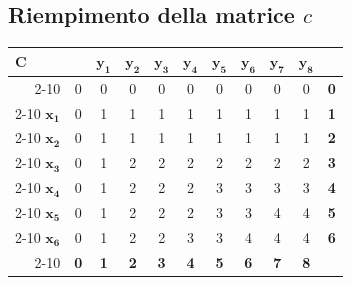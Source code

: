 \subsection{Riempimento della matrice $c$}
\begin{center}
\renewcommand{\arraystretch}{1.65}
\setlength{\tabcolsep}{11pt}
\begin{tabular}{r | c | c | c | c | c | c | c | c | c | l}
\multicolumn{1}{l}{\Large $\boldsymbol{C}$} & \multicolumn{1}{c}{} & \multicolumn{1}{c}{\textcolor{ycolor}{$\mathbf{y_1}$}} & \multicolumn{1}{c}{\textcolor{ycolor}{$\mathbf{y_2}$}} & \multicolumn{1}{c}{\textcolor{ycolor}{$\mathbf{y_3}$}} & \multicolumn{1}{c}{\textcolor{ycolor}{$\mathbf{y_4}$}} & \multicolumn{1}{c}{\textcolor{ycolor}{$\mathbf{y_5}$}} & \multicolumn{1}{c}{\textcolor{ycolor}{$\mathbf{y_6}$}} & \multicolumn{1}{c}{\textcolor{ycolor}{$\mathbf{y_7}$}} & \multicolumn{1}{c}{\textcolor{ycolor}{$\mathbf{y_8}$}} & \multicolumn{1}{l}{} \\
\cline{2-10}
 & 0 & 0 & 0 & 0 & 0 & 0 & 0 & 0 & 0 & \textcolor{xring}{\textbf{0}} \\
\cline{2-10}
\textcolor{xcolor}{$\mathbf{x_1}$} & 0 & 1 & 1 & 1 & 1 & 1 & 1 & 1 & 1 & \textcolor{xring}{\textbf{1}} \\
\cline{2-10}
\textcolor{xcolor}{$\mathbf{x_2}$} & 0 & 1 & 1 & 1 & 1 & 1 & 1 & 1 & 1 & \textcolor{xring}{\textbf{2}} \\
\cline{2-10}
\textcolor{xcolor}{$\mathbf{x_3}$} & 0 & 1 & 2 & 2 & 2 & 2 & 2 & 2 & 2 & \textcolor{xring}{\textbf{3}} \\
\cline{2-10}
\textcolor{xcolor}{$\mathbf{x_4}$} & 0 & 1 & 2 & 2 & 2 & 3 & 3 & 3 & 3 & \textcolor{xring}{\textbf{4}} \\
\cline{2-10}
\textcolor{xcolor}{$\mathbf{x_5}$} & 0 & 1 & 2 & 2 & 2 & 3 & 3 & 4 & 4 & \textcolor{xring}{\textbf{5}} \\
\cline{2-10}
\textcolor{xcolor}{$\mathbf{x_6}$} & 0 & 1 & 2 & 2 & 3 & 3 & 4 & 4 & 4 & \textcolor{xring}{\textbf{6}} \\
\cline{2-10}
\multicolumn{1}{c}{} & \multicolumn{1}{c}{\textcolor{yring}{\textbf{0}}} & \multicolumn{1}{c}{\textcolor{yring}{\textbf{1}}} & \multicolumn{1}{c}{\textcolor{yring}{\textbf{2}}} & \multicolumn{1}{c}{\textcolor{yring}{\textbf{3}}} & \multicolumn{1}{c}{\textcolor{yring}{\textbf{4}}} & \multicolumn{1}{c}{\textcolor{yring}{\textbf{5}}} & \multicolumn{1}{c}{\textcolor{yring}{\textbf{6}}} & \multicolumn{1}{c}{\textcolor{yring}{\textbf{7}}} & \multicolumn{1}{c}{\textcolor{yring}{\textbf{8}}} & \multicolumn{1}{c}{} \\
\end{tabular}
\end{center}

